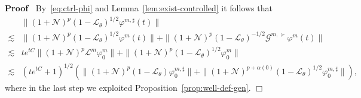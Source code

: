\documentclass{article}
\newcommand{\tmcolor}[2]{{\color{#1}{#2}}}
\newenvironment{proof}{\noindent\textbf{Proof\ }}{\hspace*{\fill}$\Box$\medskip}
\begin{document}
\begin{proof}
  \tmcolor{red}{}By~{\eqref{eq:ctrl-phi}} and Lemma~\ref{lem:exist-controlled}
  it follows that
  \[ \begin{array}{ll}
       & \| (1 +\mathcal{N})^p (1 -\mathcal{L}_{\theta})^{1 / 2} \varphi^{m,
       \sharp} (t) \|\\
       \lesssim & \| (1 +\mathcal{N})^p (1 -\mathcal{L}_{\theta})^{1 / 2}
       \varphi^m (t) \| + \| (1 +\mathcal{N})^p (1 -\mathcal{L}_{\theta})^{- 1
       / 2} \mathcal{G}^{m, \succ} \varphi^m (t) \|\\
       \lesssim & t e^{t C} \| (1 +\mathcal{N})^p \mathcal{L}^m \varphi^m_0 \|
       + \| (1 +\mathcal{N})^p (1 -\mathcal{L}_{\theta})^{1 / 2} \varphi^m_0
       \|\\
       \lesssim & (t e^{t C} + 1)^{1 / 2} (\| (1 +\mathcal{N})^p (1
       -\mathcal{L}_{\theta}) \varphi_0^{m, \sharp} \| + \| (1
       +\mathcal{N})^{p + \alpha (0)} (1 -\mathcal{L}_{\theta})^{1 / 2}
       \varphi_0^{m, \sharp} \|),
     \end{array} \]
  where in the last step we exploited Proposition~\ref{prop:well-def-gen}.
\end{proof}
\end{document}
